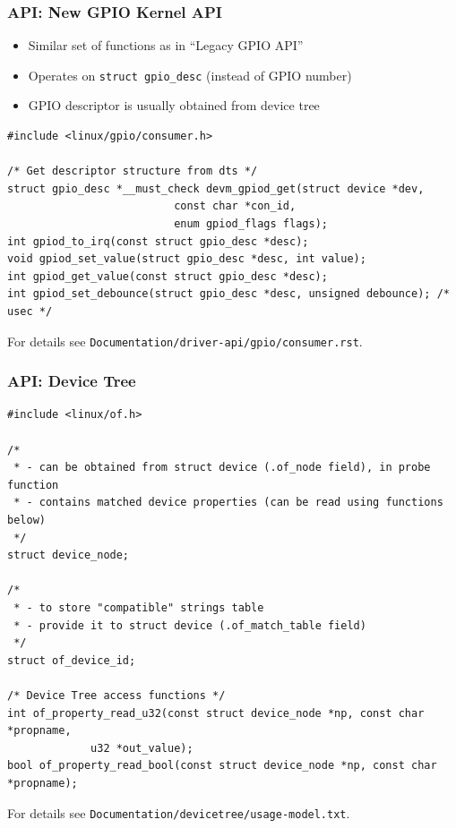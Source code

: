 \begin{frame}[containsverbatim]
  \frametitle{API: New GPIO Kernel API}

  \begin{itemize}
  \item Similar set of functions as in ``Legacy GPIO API''
  \item Operates on \texttt{struct gpio\_desc} (instead of GPIO number)
  \item GPIO descriptor is usually obtained from device tree
  \end{itemize}

  \begin{lstlisting}[style=c,numbers=none]
#include <linux/gpio/consumer.h>

/* Get descriptor structure from dts */
struct gpio_desc *__must_check devm_gpiod_get(struct device *dev,
					      const char *con_id,
					      enum gpiod_flags flags);
int gpiod_to_irq(const struct gpio_desc *desc);
void gpiod_set_value(struct gpio_desc *desc, int value);
int gpiod_get_value(const struct gpio_desc *desc);
int gpiod_set_debounce(struct gpio_desc *desc, unsigned debounce); /* usec */
  \end{lstlisting}

  For details see \texttt{Documentation/driver-api/gpio/consumer.rst}.
\end{frame}

\begin{frame}[containsverbatim]
  \frametitle{API: Device Tree}
  \begin{lstlisting}[style=c,numbers=none]
#include <linux/of.h>

/*
 * - can be obtained from struct device (.of_node field), in probe function
 * - contains matched device properties (can be read using functions below)
 */
struct device_node;

/*
 * - to store "compatible" strings table
 * - provide it to struct device (.of_match_table field)
 */
struct of_device_id;

/* Device Tree access functions */
int of_property_read_u32(const struct device_node *np, const char *propname,
			 u32 *out_value);
bool of_property_read_bool(const struct device_node *np, const char *propname);
  \end{lstlisting}

  For details see \texttt{Documentation/devicetree/usage-model.txt}.
  \vspace*{-5mm}
\end{frame}

